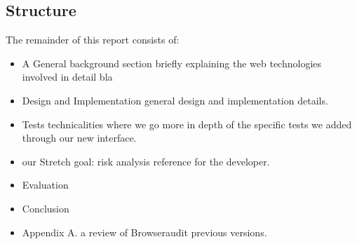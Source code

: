 \documentclass[a4paper,12pt]{report}
\begin{document}
\subsection{Structure}
The remainder of this report consists of:
\begin{itemize}
 \item A General background section briefly explaining the web technologies involved in detail bla
 \item Design and Implementation general design and implementation details.
 \item Tests technicalities where we go more in depth of the specific tests we added through our new interface.
 \item our Stretch goal: risk analysis reference for the developer.
 \item Evaluation
 \item Conclusion
 \item Appendix A. a review of Browseraudit previous versions. 
\end{itemize}










\appendix

\end{document}
